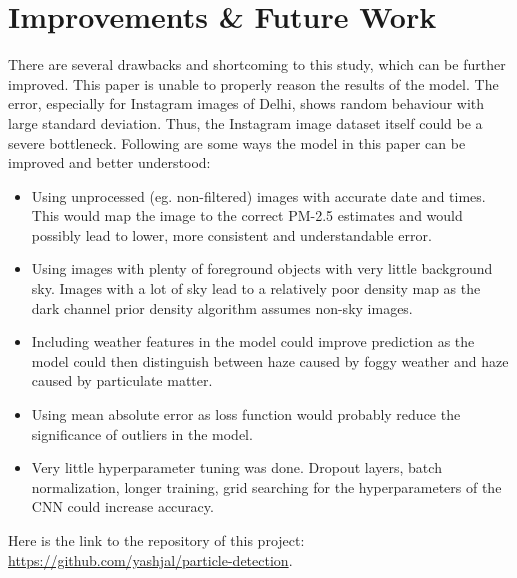 \documentclass{article}
\begin{document}
\section{Improvements \& Future Work}

There are several drawbacks and shortcoming to this study, which can be further improved. This paper is unable to properly reason the results of the model. The error, especially for Instagram images of Delhi, shows random behaviour with large standard deviation. Thus, the Instagram image dataset itself could be a severe bottleneck. Following are some ways the model in this paper can be improved and better understood:

\begin{itemize}
    \item Using unprocessed (eg. non-filtered) images with accurate date and times. This would map the image to the correct PM-2.5 estimates and would possibly lead to lower, more consistent and understandable error.
    \item Using images with plenty of foreground objects with very little background sky. Images with a lot of sky lead to a relatively poor density map as the dark channel prior density algorithm assumes non-sky images.
    \item Including weather features in the model could improve prediction as the model could then distinguish between haze caused by foggy weather and haze caused by particulate matter.
    \item Using mean absolute error as loss function would probably reduce the significance of outliers in the model.
    \item Very little hyperparameter tuning was done. Dropout layers, batch normalization, longer training, grid searching for the hyperparameters of the CNN could increase accuracy.
\end{itemize}

Here is the link to the repository of this project: \url{https://github.com/yashjal/particle-detection}.

  
\end{document}
